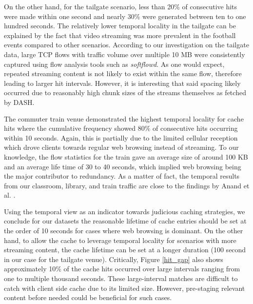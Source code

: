 \documentclass{sig-alternate}
\begin{document}
On the other hand, for the tailgate scenario, less than 20\% of consecutive hits were made within one second and nearly 30\% were generated between ten to one hundred seconds. The relatively lower temporal locality in the tailgate can be explained by the fact that video streaming was more prevalent in the football events compared to other scenarios. According to our investigation on the tailgate data, large TCP flows with traffic volume over multiple 10 MB were consistently captured using flow analysis tools such as \emph{softflowd}. As one would expect, repeated streaming content is not likely to exist within the same flow, therefore leading to larger hit intervals. However, it is interesting that said spacing likely occurred due to reasonably high chunk sizes of the streams themselves as fetched by DASH\cite{ISO:DASH}.    

The commuter train venue demonstrated the highest temporal locality for cache hits where the cumulative frequency showed 80\% of consecutive hits occurring within 10 seconds. Again, this is partially due to the limited cellular reception which drove clients towards regular web browsing instead of streaming. To our knowledge, the flow statistics for the train gave an average size of around 100 KB and an average life time of 30 to 40 seconds, which implied web browsing being the major contributor to redundancy. As a matter of fact, the temporal results from our classroom, library, and train traffic are close to the findings by Anand et al. \cite{Anand:2009}.     

Using the temporal view as an indicator towards judicious caching strategies, we conclude for our datasets the reasonable lifetime of cache entries should be set at the order of 10 seconds for cases where web browsing is dominant. On the other hand, to allow the cache to leverage temporal locality for scenarios with more streaming content, the cache lifetime can be set at a longer duration (100 second in our case for the tailgate venue). Critically, Figure \ref{hit_gap} also shows approximately 10\% of the cache hits occurred over large intervals ranging from one to multiple thousand seconds. These large-interval matches are difficult to catch with client side cache due to its limited size. However, pre-staging relevant content before needed could be beneficial for such cases.       
\end{document}
